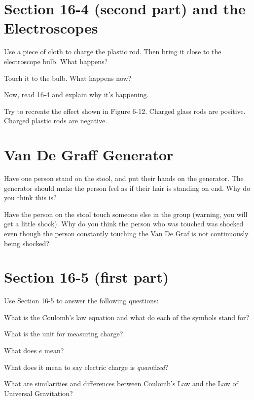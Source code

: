 \documentclass[10pt]{exam}
\begin{document}
\pagebreak

\section{Section 16-4 (second part) and the Electroscopes}

\begin{questions}
  \question
    Use a piece of cloth to charge the plastic rod.  Then bring it close to the electroscope bulb.  What happens? \vs

  \question
    Touch it to the bulb.  What happens now? \vs

  \question
    Now, read 16-4 and explain why it's happening. \vs

  \question
    Try to recreate the effect shown in Figure 6-12.  Charged glass rods are positive.  Charged plastic rods are negative. \vs
    
\end{questions}

\section{Van De Graff Generator}

\begin{questions}
  \question
    Have one person stand on the stool, and put their hands on the generator.  The generator should make the person feel as if their hair is standing on end.  Why do you think this is? \vs

  \question
    Have the person on the stool touch someone else in the group (warning, you will get a little shock).  Why do you think the person who was touched was shocked even though the person constantly touching the Van De Graf is not continuously being shocked? \vs

\end{questions}

\pagebreak

\section{Section 16-5 (first part)}

Use Section 16-5 to answer the following questions:

\begin{questions}
  \question
     What is the Coulomb's law equation and what do each of the symbols stand for? \vs[2]

  \question
    What is the unit for measuring charge? \vs
  
  \question
    What does $e$ mean? \vs
  
  \question
    What does it mean to say electric charge is \emph{quantized}? \vs
  
  \question
    What are similarities and differences between Coulomb's Law and the Law of Universal Gravitation? \vs  
    
\end{questions}
\end{document}
